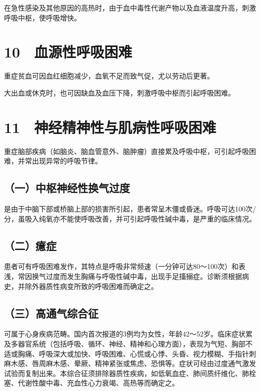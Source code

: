 在急性感染及其他原因的高热时，由于血中毒性代谢产物以及血液温度升高，刺激呼吸中枢，使呼吸增快。

\protect\hypertarget{text00053.html}{}{}

\section{10　血源性呼吸困难}

重症贫血可因血红细胞减少，血氧不足而致气促，尤以劳动后更著。

大出血或休克时，也可因缺血及血压下降，刺激呼吸中枢而引起呼吸困难。

\protect\hypertarget{text00054.html}{}{}

\section{11　神经精神性与肌病性呼吸困难}

重症脑部疾病（如脑炎、脑血管意外、脑肿瘤）直接累及呼吸中枢，可引起呼吸困难，并常出现异常的呼吸节律。

\subsection{（一）中枢神经性换气过度}

是由于中脑下部或桥脑上部的损害所引起，患者常呈木僵或昏迷。呼吸可达100次/分，虽吸入纯氧亦不能使呼吸改善，并可引起呼吸性碱中毒，是严重的临床情况。

\subsection{（二）癔症}

患者可有呼吸困难发作，其特点是呼吸非常频速（一分钟可达80～100次）和表浅，常因换气过度而发生胸痛与呼吸性碱中毒，出现手足搐搦症。诊断须根据病史，并除外器质性病变所致的呼吸困难而确定之。

\subsection{（三）高通气综合征}

可属于心身疾病范畴。国内首次报道的3例均为女性，年龄42～52岁。临床症状累及多器官系统（包括呼吸、循环、神经、精神和心理方面），表现为气短、胸部不适或胸痛、呼吸深大或加快、呼吸困难、心慌或心悸、头昏、视力模糊、手指针刺麻木感、唇周麻木感、晕厥、精神紧张或焦虑、恐惧等。症状可经由过度通气激发试验而复制出来。本综合征须排除器质性疾病，如低氧血症、肺间质纤维化、肺栓塞、代谢性酸中毒、充血性心力衰竭、高热等而确定之。

